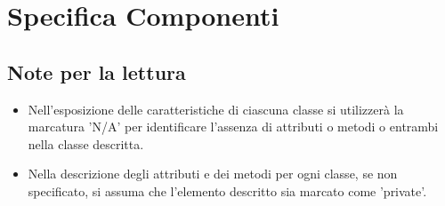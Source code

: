 %
%


\section{Specifica Componenti} %
\label{sec:specifica_componenti}

	\subsection{Note per la lettura} %
	\label{sub:note_specifica}
	\begin{itemize}
		\item Nell'esposizione delle caratteristiche di ciascuna classe si utilizzerà la marcatura 'N/A' per identificare l'assenza di attributi o metodi o entrambi nella classe descritta.
		\item Nella descrizione degli attributi e dei metodi per ogni classe, se non specificato, si assuma che l'elemento descritto sia marcato come 'private'.
	\end{itemize}
	

	 \clearpage \newpage
	 \clearpage \newpage
	 \clearpage \newpage

